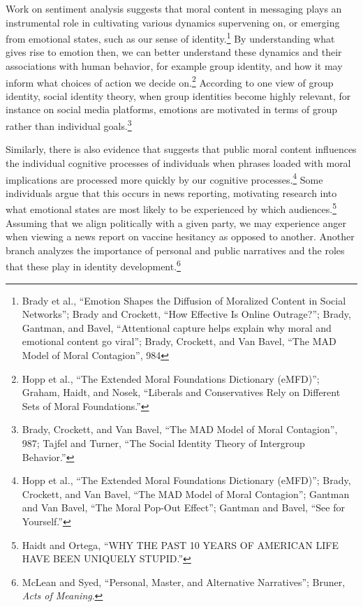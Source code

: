 \documentclass[phdthesis,12pt,final]{wuthesis}
\theoremstyle{definition}
\theoremstyle{definition}
\theoremstyle{definition}
\theoremstyle{definition}
\theoremstyle{remark}
\begin{document}
Work on sentiment analysis suggests that moral content in messaging plays an instrumental role in cultivating various dynamics supervening on, or emerging from emotional states, such as our sense of identity.\footnote{Brady et al., {``Emotion Shapes the Diffusion of Moralized Content in Social Networks''}; Brady and Crockett, {``How Effective Is Online Outrage?''}; Brady, Gantman, and Bavel, {``Attentional capture helps explain why moral and emotional content go viral''}; Brady, Crockett, and Van Bavel, {``The {MAD} Model of Moral Contagion''}, 984} By understanding what gives rise to emotion then, we can better understand these dynamics and their associations with human behavior, for example group identity, and how it may inform what choices of action we decide on.\footnote{Hopp et al., {``The Extended {Moral Foundations Dictionary} ({eMFD})''}; Graham, Haidt, and Nosek, {``Liberals and Conservatives Rely on Different Sets of Moral Foundations.''}} According to one view of group identity, social identity theory, when group identities become highly relevant, for instance on social media platforms, emotions are motivated in terms of group rather than individual goals.\footnote{Brady, Crockett, and Van Bavel, {``The {MAD} Model of Moral Contagion''}, 987; Tajfel and Turner, {``The {Social Identity Theory} of {Intergroup Behavior}.''}}

Similarly, there is also evidence that suggests that public moral content influences the individual cognitive processes of individuals when phrases loaded with moral implications are processed more quickly by our cognitive processes.\footnote{Hopp et al., {``The Extended {Moral Foundations Dictionary} ({eMFD})''}; Brady, Crockett, and Van Bavel, {``The {MAD} Model of Moral Contagion''}; Gantman and Van Bavel, {``The Moral Pop-Out Effect''}; Gantman and Bavel, {``See for Yourself.''}} Some individuals argue that this occurs in news reporting, motivating research into what emotional states are most likely to be experienced by which audiences.\footnote{Haidt and Ortega, {``{WHY THE PAST} 10 {YEARS OF AMERICAN LIFE HAVE BEEN UNIQUELY STUPID}.''}} Assuming that we align politically with a given party, we may experience anger when viewing a news report on vaccine hesitancy as opposed to another. Another branch analyzes the importance of personal and public narratives and the roles that these play in identity development.\footnote{McLean and Syed, {``Personal, {Master}, and {Alternative Narratives}''}; Bruner, \emph{Acts of Meaning}.}
\end{document}
